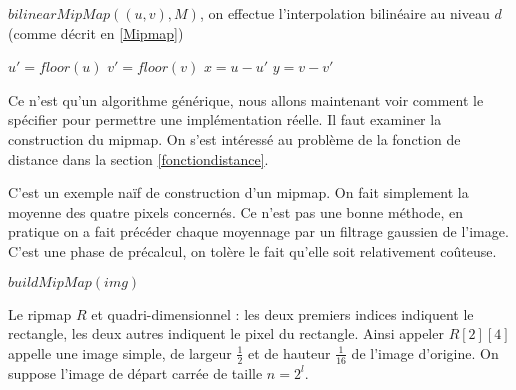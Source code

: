\medbreak
\medbreak
\medbreak
\medbreak

\begin{algorithm}[H]
\caption{$bilinearMipMap((u,v),M)$,  on effectue l'interpolation bilinéaire au niveau $d$ (comme décrit en \ref{Mipmap})}
\label{intertri2}
$u'=floor(u)$\;
$v' = floor(v)$\;
$x=u-u'$\;
$y = v-v'$\;
\;
\end{algorithm}

\medbreak
\medbreak
Ce n'est qu'un algorithme générique, nous allons maintenant voir comment le spécifier pour permettre une implémentation réelle. Il faut examiner la construction du mipmap. On s'est intéressé au problème de la fonction de distance dans la section \ref{fonctiondistance}.


C'est un exemple naïf de construction d'un mipmap. On fait simplement la moyenne des quatre pixels concernés. Ce n'est pas une bonne méthode, en pratique on a fait précéder chaque moyennage par un filtrage gaussien de l'image. C'est une phase de précalcul, on tolère le fait qu'elle soit relativement coûteuse.

 \medbreak
  \medbreak
 \begin{algorithm}[H]
 \caption{$buildMipMap(img)$}
 \label{buildMipmap}
 \end{algorithm}
 \medbreak
  \medbreak

\label{pseudo_code_Ripmap}



Le ripmap $R$ et quadri-dimensionnel  : les deux premiers indices indiquent le rectangle, les deux autres indiquent le pixel du rectangle. Ainsi appeler $R[2][4]$ appelle une image simple, de largeur $\frac{1}{2}$ et de hauteur $\frac{1}{16}$ de l'image d'origine. On suppose l'image de départ carrée de taille $n=2^l$.



